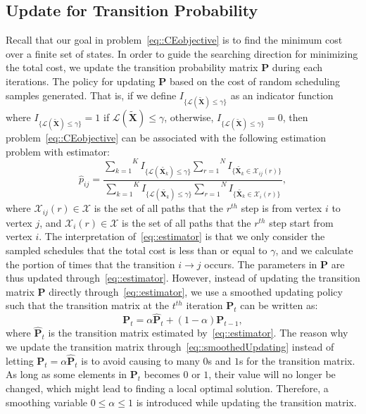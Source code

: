 \subsection{Update for Transition Probability}
Recall that our goal in problem~\eqref{eq::CEobjective} is to find the minimum cost over a finite set of states.
In order to guide the searching direction for minimizing the total cost, we update the transition probability matrix $\mathbf{P}$ during each iterations.
The policy for updating $\mathbf{P}$ based on the cost of random scheduling samples generated.
That is, if we define $I_{\{\mathcal{L}(\tilde{\mathbf{X}}) \leq \gamma \}}$ as an indicator function where ${I_{\{\mathcal{L}(\tilde{\mathbf{X}}) \leq \gamma \}} = 1}$ if ${\mathcal{L}(\tilde{\mathbf{X}}) \leq \gamma}$, otherwise, ${I_{\{\mathcal{L}(\tilde{\mathbf{X}}) \leq \gamma \}} = 0}$, then problem~\eqref{eq::CEobjective} can be associated with the following estimation problem with estimator:
\begin{equation}
\hat{p}_{ij} = \frac{ \overset{K}{\underset{k=1}{\sum}} I_{\{ \mathcal{L}( \tilde{\mathbf{X}_k} )\leq\gamma \}}
                                 \overset{N}{\underset{r=1}{\sum}} I_{\{ \tilde{\mathbf{X}_k}\in \mathcal{X}_{ij}(r)\}} }
                               { \overset{K}{\underset{k=1}{\sum}} I_{\{ \mathcal{L}(\tilde{\mathbf{X}_k})\leq\gamma \}}
                                  \overset{N}{\underset{r=1}{\sum}} I_{\{ \tilde{\mathbf{X}_k}\in \mathcal{X}_{i}(r)\}} },
\label{eq::estimator}
\end{equation}
where ${\mathcal{X}_{ij}(r) \in \mathcal{X}}$ is the set of all paths that the $r^{th}$ step is from vertex $i$ to vertex $j$, and ${\mathcal{X}_{i}(r) \in \mathcal{X}}$ is the set of all paths that the $r^{th}$ step start from vertex $i$.
The interpretation of~\eqref{eq::estimator} is that we only consider the sampled schedules that the total cost is less than or equal to $\gamma$, and we calculate the portion of times that the transition $i \to j$ occurs.
The parameters in $\mathbf{P}$ are thus updated through~\eqref{eq::estimator}.
However, instead of updating the transition matrix $\mathbf{P}$ directly through~\eqref{eq::estimator}, we use a smoothed updating policy such that the transition matrix at the $t^{th}$ iteration $\mathbf{P}_t$ can be written as:
\begin{equation}
\mathbf{P}_t = \alpha\hat{\mathbf{P}}_t + (1-\alpha)\mathbf{P}_{t-1},
\label{eq::smoothedUpdating}
\end{equation}
where $\hat{\mathbf{P}}_t$ is the transition matrix estimated by~\eqref{eq::estimator}.
The reason why we update the transition matrix through~\eqref{eq::smoothedUpdating} instead of letting ${\mathbf{P}_t = \alpha\hat{\mathbf{P}}_t}$ is to avoid causing to many $0$s and $1$s for the transition matrix.
As long as some elements in $\mathbf{P}_t$ becomes $0$ or $1$, their value will no longer be changed, which might lead to finding a local optimal solution.
Therefore, a smoothing variable ${0 \leq \alpha \leq 1}$ is introduced while updating the transition matrix.
%
